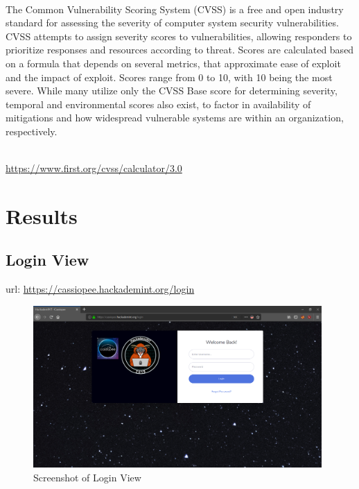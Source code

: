 \vspace{1cm}

\\
The Common Vulnerability Scoring System (CVSS) is a free and open industry standard for assessing the severity of computer system security vulnerabilities. CVSS attempts to assign severity scores to vulnerabilities, allowing responders to prioritize responses and resources according to threat. Scores are calculated based on a formula that depends on several metrics, that approximate ease of exploit and the impact of exploit. Scores range from 0 to 10, with 10 being the most severe. While many utilize only the CVSS Base score for determining severity, temporal and environmental scores also exist, to factor in availability of mitigations and how widespread vulnerable systems are within an organization, respectively.

\\
\vspace{0.2cm}
\url{https://www.first.org/cvss/calculator/3.0}

\pagebreak

\section{Results}

\subsection{Login View}
url: \url{https://cassiopee.hackademint.org/login}

\begin{figure}[!h]
  \centering
  \includegraphics[width=0.98\textwidth]{images/flask-application-01.png}
  \caption{Screenshot of Login View}
  \label{LoginView}
\end{figure}

